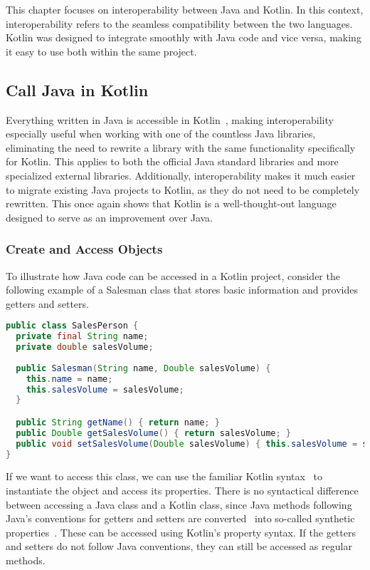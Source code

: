 \documentclass[a4paper,11pt]{article}
\begin{document}
This chapter focuses on interoperability between Java and Kotlin. In this context, interoperability refers to the seamless compatibility between the two languages. Kotlin was designed to integrate smoothly with Java code and vice versa, making it easy to use both within the same project.

\subsection{Call Java in Kotlin}
Everything written in Java is accessible in Kotlin~\cite{interop}, making interoperability especially useful when working with one of the countless Java libraries, eliminating the need to rewrite a library with the same functionality specifically for Kotlin. This applies to both the official Java standard libraries and more specialized external libraries. Additionally, interoperability makes it much easier to migrate existing Java projects to Kotlin, as they do not need to be completely rewritten. This once again shows that Kotlin is a well-thought-out language designed to serve as an improvement over Java.

\subsubsection{Create and Access Objects}
To illustrate how Java code can be accessed in a Kotlin project, consider the following example of a Salesman class that stores basic information and provides getters and setters.
\begin{lstlisting}[language=Java,title={Example Java class}]
public class SalesPerson {
  private final String name;
  private double salesVolume;
  
  public Salesman(String name, Double salesVolume) {
    this.name = name;
    this.salesVolume = salesVolume;
  }

  public String getName() { return name; }
  public Double getSalesVolume() { return salesVolume; }
  public void setSalesVolume(Double salesVolume) { this.salesVolume = salesVolume; }
}
\end{lstlisting}

If we want to access this class, we can use the familiar Kotlin syntax~\cite{interop} to instantiate the object and access its properties. There is no syntactical difference between accessing a Java class and a Kotlin class, since Java methods following Java's conventions for getters and setters are converted~\cite{interop-getter-setter} into so-called synthetic properties~\cite{interop-synthetic-property}. These can be accessed using Kotlin's property syntax. If the getters and setters do not follow Java conventions, they can still be accessed as regular methods.
\end{document}

